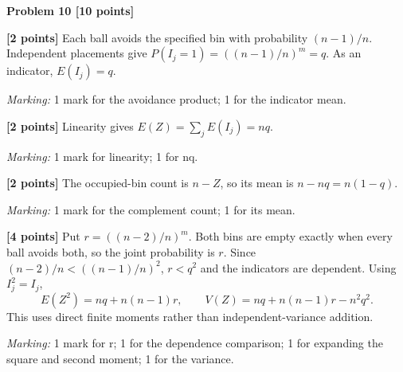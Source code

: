 \documentclass[12pt,letterpaper]{article}
\newcommand{\problemheading}[2][5\baselineskip]{\Needspace{#1}\par\noindent\hspace*{-0.625in}\textbf{#2}\par\nobreak\vspace{0.3em}}
\begin{document}
\vspace{0.65em}
\problemheading[\dimexpr 3\baselineskip+4\baselineskip\relax]{Problem 10 [10 points]}
\begin{description}[font=\normalfont,leftmargin=1.2em,labelsep=0.4em]
\item[(a)] \textbf{[2 points]} Each ball avoids the specified bin with probability $(n-1)/n$. Independent placements give $P(I_j=1)=((n-1)/n)^m=q$. As an indicator, $E(I_j)=q$.
\par\textit{Marking:} 1 mark for the avoidance product; 1 for the indicator mean.
\item[(b)] \textbf{[2 points]} Linearity gives $E(Z)=\sum_j E(I_j)=nq$.
\par\textit{Marking:} 1 mark for linearity; 1 for nq.
\item[(c)] \textbf{[2 points]} The occupied-bin count is $n-Z$, so its mean is $n-nq=n(1-q)$.
\par\textit{Marking:} 1 mark for the complement count; 1 for its mean.
\item[(d)] \textbf{[4 points]} Put $r=((n-2)/n)^m$. Both bins are empty exactly when every ball avoids both, so the joint probability is $r$. Since $(n-2)/n<((n-1)/n)^2$, $r<q^2$ and the indicators are dependent. Using $I_j^2=I_j$,\[E(Z^2)=nq+n(n-1)r,\qquad V(Z)=nq+n(n-1)r-n^2q^2.\]This uses direct finite moments rather than independent-variance addition.
\par\textit{Marking:} 1 mark for r; 1 for the dependence comparison; 1 for expanding the square and second moment; 1 for the variance.
\end{description}
\end{document}
